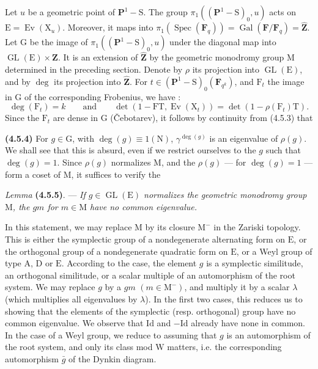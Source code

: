 \documentclass[11pt,leqno]{article}
\begin{document}
Let \(u\) be a geometric point of \(\mathbf{P}^1-\mathrm{S}\). The group \(\pi_1((\mathbf{P}^1-\mathrm{S})_0,u)\) acts on \(\mathrm{E}=\operatorname{Ev}(\mathrm{X}_u)\). Moreover, it maps into \(\pi_1(\operatorname{Spec}(\mathbf{F}_q))=\operatorname{Gal}(\mathbf{F}/\mathbf{F}_q)=\widehat{\mathbf{Z}}\). Let \(\mathrm{G}\) be the image of \(\pi_1((\mathbf{P}^1-\mathrm{S})_0,u)\) under the diagonal map into \(\operatorname{GL}(\mathrm{E})\times\widehat{\mathbf{Z}}\). It is an extension of \(\widehat{\mathbf{Z}}\) by the geometric monodromy group \(\mathrm{M}\) determined in the preceding section. Denote by \(\rho\) its projection into \(\operatorname{GL}(\mathrm{E})\), and by \(\deg\) its projection into \(\widehat{\mathbf{Z}}\). For \(t\in(\mathbf{P}^1-\mathrm{S})_0(\mathbf{F}_{q^k})\), and \(\mathrm{F}_t\) the image in \(\mathrm{G}\) of the corresponding Frobenius, we have :
\[
\deg(\mathrm{F}_t)=k
\qquad\text{and}\qquad
\det(1-\mathrm{F}\mathrm{T},\operatorname{Ev}(\mathrm{X}_t))
=\det(1-\rho(\mathrm{F}_t)\mathrm{T}).
\]
Since the \(\mathrm{F}_t\) are dense in \(\mathrm{G}\) (\v{C}ebotarev), it follows by continuity from (4.5.3) that

\textbf{(4.5.4)} For \(g\in\mathrm{G}\), with \(\deg(g)\equiv1(\mathrm{N})\), \(\gamma^{\deg(g)}\) is an eigenvalue of \(\rho(g)\). We shall see that this is absurd, even if we restrict ourselves to the \(g\) such that \(\deg(g)=1\). Since \(\rho(g)\) normalizes \(\mathrm{M}\), and the \(\rho(g)\) — for \(\deg(g)=1\) — form a coset of \(\mathrm{M}\), it suffices to verify the

\textit{Lemma} \textbf{(4.5.5)}. — \textit{If \(g\in\operatorname{GL}(\mathrm{E})\) normalizes the geometric monodromy group \(\mathrm{M}\), the \(gm\) for \(m\in\mathrm{M}\) have no common eigenvalue.}

In this statement, we may replace \(\mathrm{M}\) by its closure \(\mathrm{M}^{-}\) in the Zariski topology. This is either the symplectic group of a nondegenerate alternating form on \(\mathrm{E}\), or the orthogonal group of a nondegenerate quadratic form on \(\mathrm{E}\), or a Weyl group of type \(\mathrm{A}\), \(\mathrm{D}\) or \(\mathrm{E}\). According to the case, the element \(g\) is a symplectic similitude, an orthogonal similitude, or a scalar multiple of an automorphism of the root system. We may replace \(g\) by a \(gm\) \((m\in\mathrm{M}^{-})\), and multiply it by a scalar \(\lambda\) (which multiplies all eigenvalues by \(\lambda\)). In the first two cases, this reduces us to showing that the elements of the symplectic (resp. orthogonal) group have no common eigenvalue. We observe that \(\mathrm{Id}\) and \(-\mathrm{Id}\) already have none in common. In the case of a Weyl group, we reduce to assuming that \(g\) is an automorphism of the root system, and only its class mod \(\mathrm{W}\) matters, i.e. the corresponding automorphism \(\bar{g}\) of the Dynkin diagram.
\end{document}

